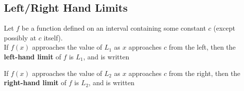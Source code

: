 \documentclass[notes]{subfiles}
\begin{document}
	\subsection*{Left/Right Hand Limits}
		\begin{defn}
			Let $f$ be a function defined on an interval containing some constant $c$ (except possibly at $c$ itself).\\
				\tabitem If $f(x)$ approaches the value of $L_1$ as $x$ approaches $c$ from the left, then the \textbf{left-hand limit} of $f$ is $L_1$, and is written 
		
				\tabitem If $f(x)$ approaches the value of $L_2$ as $x$ approaches $c$ from the right, then the \textbf{right-hand limit} of $f$ is $L_2$, and is written 
		\end{defn}
		
\end{document}
